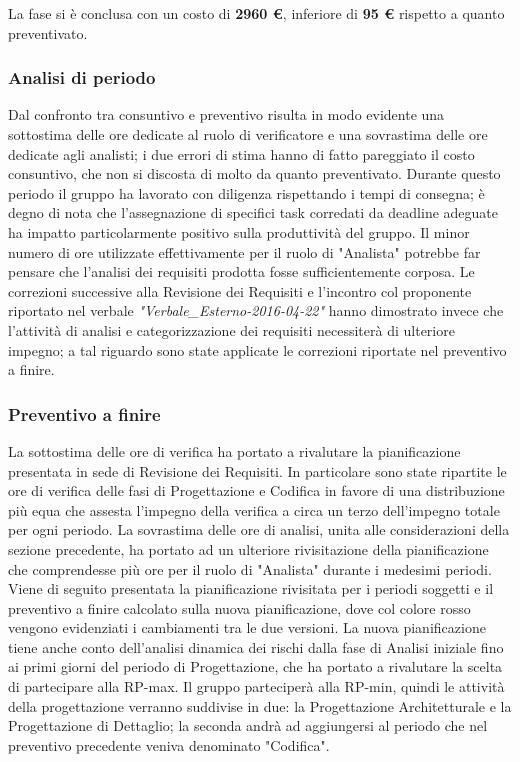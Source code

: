 \documentclass[a4paper,11pt]{article}
\begin{document}
	La fase si è conclusa con un costo di \textbf{2960 \euro}, inferiore di \textbf{95 \euro} rispetto a quanto preventivato.
	
	\subsubsection{Analisi di periodo}
	Dal confronto tra consuntivo e preventivo risulta in modo evidente una sottostima delle ore dedicate al ruolo di verificatore e una sovrastima delle ore dedicate agli analisti; i due errori di stima hanno di fatto pareggiato il costo consuntivo, che non si discosta di molto da quanto preventivato. Durante questo periodo il gruppo ha lavorato con diligenza rispettando i tempi di consegna; è degno di nota che l'assegnazione di specifici task corredati da deadline adeguate ha impatto particolarmente positivo sulla produttività del gruppo. \newline
	Il minor numero di ore utilizzate effettivamente per il ruolo di "Analista" potrebbe far pensare che l'analisi dei requisiti prodotta fosse sufficientemente corposa. Le correzioni successive alla Revisione dei Requisiti e l'incontro col proponente riportato nel verbale \emph{"Verbale\_Esterno-2016-04-22"} hanno dimostrato invece che l'attività di analisi e categorizzazione dei requisiti necessiterà di ulteriore impegno; a tal riguardo sono state applicate le correzioni riportate nel preventivo a finire.
	\subsubsection{Preventivo a finire}
	\label{Preventivo a finire}
	La sottostima delle ore di verifica ha portato a rivalutare la pianificazione presentata in sede di Revisione dei Requisiti. In particolare sono state ripartite le ore di verifica delle fasi di Progettazione e Codifica in favore di una distribuzione più equa che assesta l'impegno della verifica a circa un terzo dell'impegno totale per ogni periodo. La sovrastima delle ore di analisi, unita alle considerazioni della sezione precedente, ha portato ad un ulteriore rivisitazione della pianificazione che comprendesse più ore per il ruolo di "Analista" durante i medesimi periodi.
	Viene di seguito presentata la pianificazione rivisitata per i periodi soggetti e il preventivo a finire calcolato sulla nuova pianificazione, dove col colore rosso vengono evidenziati i cambiamenti tra le due versioni. La nuova pianificazione tiene anche conto dell'analisi dinamica dei rischi dalla fase di Analisi iniziale fino ai primi giorni del periodo di Progettazione, che ha portato a rivalutare la scelta di partecipare alla RP-max. Il gruppo parteciperà alla RP-min, quindi le attività della progettazione verranno suddivise in due: la Progettazione Architetturale e la Progettazione di Dettaglio; la seconda andrà ad aggiungersi al periodo che nel preventivo precedente veniva denominato "Codifica".
	
\end{document}
